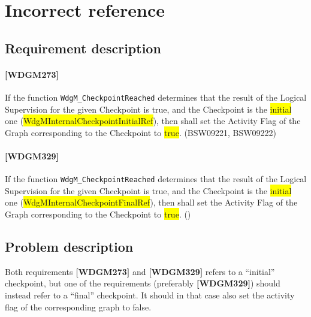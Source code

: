 



\section{Incorrect reference}
\subsection{Requirement description}
\paragraph{[WDGM273]} If the function
\lstinline!WdgM_CheckpointReached! determines that the result of the
Logical Supervision for the given Checkpoint is true, and the
Checkpoint is the \colorbox{yellow}{initial} one
(\colorbox{yellow}{WdgMInternalCheckpointInitialRef}), then shall set
the Activity Flag of the Graph corresponding to the Checkpoint to
\colorbox{yellow}{true}. (BSW09221, BSW09222)

\paragraph{[WDGM329]} If the function
\lstinline!WdgM_CheckpointReached! determines that the result of the
Logical Supervision for the given Checkpoint is true, and the
Checkpoint is the \colorbox{yellow}{initial} one
(\colorbox{yellow}{WdgMInternalCheckpointFinalRef}), then shall set
the Activity Flag of the Graph corresponding to the Checkpoint to
\colorbox{yellow}{true}. ()

\subsection{Problem description}
Both requirements \textbf{[WDGM273]} and \textbf{[WDGM329]} refers to
a ``initial'' checkpoint, but one of the requirements (preferably
\textbf{[WDGM329]}) should instead refer to a ``final'' checkpoint. It
should in that case also set the activity flag of the corresponding
graph to false.

